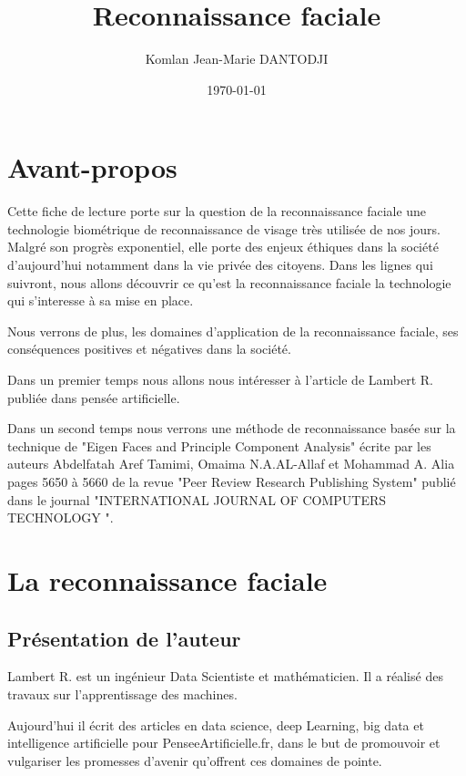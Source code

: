\documentclass[12pt, letterpaper]{article}
\title{Reconnaissance faciale}
\author{Komlan Jean-Marie DANTODJI
\\
    \multicolumn{1}{
        p{.7\textwidth}}{\centering\emph{Université Paris Vincennes St-Denis\\
  UFR mathématiques, informatique, technologies sciences de l'information\\}
  L3 Informatique}
}
\date{\today}
\begin{document}
\begin{titlepage}
    \maketitle
\end{titlepage}

\tableofcontents

\newpage
\section{Avant-propos}
\par Cette fiche de lecture porte sur la question de la reconnaissance faciale une technologie biométrique de reconnaissance de visage très utilisée de nos jours. Malgré son progrès exponentiel, elle porte des enjeux éthiques dans la société d'aujourd'hui notamment dans la vie privée des citoyens. Dans les lignes qui suivront, nous allons découvrir ce qu'est la reconnaissance faciale la technologie qui s'interesse à sa mise en place. 
\par Nous verrons de plus, les domaines d'application de la reconnaissance faciale, ses conséquences positives et négatives dans la société.\\

\par Dans un premier temps nous allons nous intéresser à l'article de Lambert R. publiée dans pensée artificielle. \\
\par Dans un second temps nous verrons une méthode de reconnaissance basée sur la technique de "Eigen Faces and Principle Component Analysis" écrite par les auteurs Abdelfatah Aref Tamimi, Omaima N.A.AL-Allaf et Mohammad A. Alia pages 5650 à 5660 de la revue "Peer Review Research Publishing System" publié dans le journal "INTERNATIONAL JOURNAL OF COMPUTERS TECHNOLOGY ".

\newpage
\section{La reconnaissance faciale}
\subsection{Présentation de l'auteur}
\par Lambert R. est un ingénieur Data Scientiste et mathématicien. Il a réalisé des travaux sur l'apprentissage des machines.
\par Aujourd'hui il écrit des articles en data science, deep Learning, big data et intelligence artificielle pour PenseeArtificielle.fr, dans le but de promouvoir et vulgariser les promesses d'avenir qu'offrent ces domaines de pointe.
\end{document}
